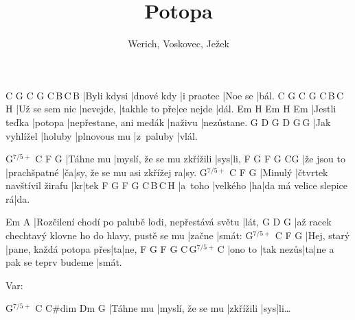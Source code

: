 \documentclass{song}
\title{Potopa}
\author{Werich, Voskovec, Ježek}
\newcommand{\aug}{$^{7/5+}$}
\begin{document}
\strophe
C           G\7        C          G\7     C\,B\7\,C\,B\7
|Byli kdysi |dnové kdy |i praotec |Noe se |bál.
C              G\7       C             G\7       C\,B\7\,C\,H\7
|Už se sem nic |nevejde, |takhle to pře|ce nejde |dál.
Em            H\7     Em                     H\7     Em
|Jestli teďka |potopa |nepřestane, ani medák |naživu |nezůstane.
G             D\7     G            D\7       G\,G\7
|Jak vyhlížel |holuby |plnovous mu |z~paluby |vlál.
\endstrophe

\strophe
{G\aug}     C                         F   G\7
|Táhne mu |myslí, že se mu zkřížili |sys|li,
F            G\7             F    G\7                        C\quad{}G\7
|že jsou to |prachšpatné |ča|sy, že se mu asi zkřížej ra|sy.
{G\aug} C                         F  G\7
|Minulý |čtvrtek navštívil žirafu |kr|tek
F       G\7      F  G\7                     C\,B\7\,C\,H\7
|a~toho |velkého |ha|da má velice slepice rá|da.
\endstrophe

\strophe
Em                                                A\7
|Rozčilení chodí po palubě lodi, nepřestává světu |lát,
G                                                   D\7    G
|až racek chechtavý klovne ho do hlavy, pustě se mu |začne |smát:
{G\aug}       C                       F  G\7
|Hej, starý |pane, každá potopa přes|ta|ne,
F       G\7       F  G\7                       C\,G\aug\,C
|ono to |tak nezůs|ta|ne a pak se teprv budeme |smát.
\endstrophe


Var:

\strophe
{G\aug}   C                C\#dim    Dm\7 G\7
|Táhne mu |myslí, že se mu |zkřížili |sys|li\ldots
\endstrophe
\end{document}

